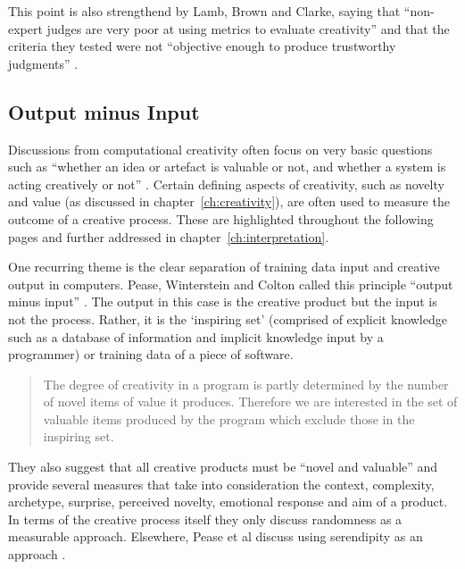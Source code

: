 This point is also strengthend by Lamb, Brown and Clarke, saying that ``non-expert judges are very poor at using metrics to evaluate creativity'' and that the criteria they tested were not ``objective enough to produce trustworthy judgments'' \autocite*{Lamb2015}.


\subsection{Output minus Input}
\label{s:o-i}

Discussions from computational creativity often focus on very basic questions such as ``whether an idea or artefact is valuable or not, and whether a system is acting creatively or not'' \autocite{Pease2011}. Certain defining aspects of creativity, such as novelty and value (as discussed in chapter~\ref{ch:creativity}), are often used to measure the outcome of a creative process. These are highlighted throughout the following pages and further addressed in chapter~\ref{ch:interpretation}.
 
One recurring theme is the clear separation of training data input and creative output in computers. Pease, Winterstein and Colton called this principle ``output minus input'' \autocite*{Pease2001}. The output in this case is the creative product but the input is not the process. Rather, it is the `inspiring set' (comprised of explicit knowledge such as a database of information and implicit knowledge input by a programmer) or training data of a piece of software.

\begin{quotation}
  The degree of creativity in a program is partly determined by the number of novel items of value it produces. Therefore we are interested in the set of valuable items produced by the program which exclude those in the inspiring set. 
\end{quotation}

They also suggest that all creative products must be ``novel and valuable'' \autocite{Pease2001} and provide several measures that take into consideration the context, complexity, archetype, surprise, perceived novelty, emotional response and aim of a product. In terms of the creative process itself they only discuss randomness as a measurable approach. Elsewhere, Pease et al discuss using serendipity as an approach \autocite*{Pease2013}.

